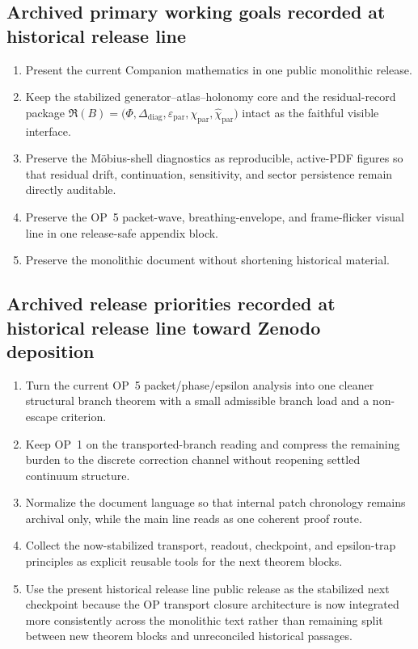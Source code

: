 \documentclass[12pt,a4paper]{article}
\DeclareRobustCommand{\QSCver}[1]{archival stage}
\renewcommand{\QSCver}[1]{historical release line}
\begin{document}
\subsection*{Archived primary working goals recorded at \QSCver{legacy.13.0}}
\begin{enumerate}[leftmargin=2em]
 \item Present the current Companion mathematics in one public monolithic release.
 \item Keep the stabilized generator--atlas--holonomy core and the residual-record package $\mathfrak R(B)=\bigl(\Phi,\Delta_{\mathrm{diag}},\varepsilon_{\mathrm{par}},\chi_{\mathrm{par}},\widehat\chi_{\mathrm{par}}\bigr)$ intact as the faithful visible interface.
 \item Preserve the M\"obius-shell diagnostics as reproducible, active-PDF figures so that residual drift, continuation, sensitivity, and sector persistence remain directly auditable.
 \item Preserve the OP~5 packet-wave, breathing-envelope, and frame-flicker visual line in one release-safe appendix block.
 \item Preserve the monolithic document without shortening historical material.
\end{enumerate}

\subsection*{Archived release priorities recorded at \QSCver{legacy.13.0} toward Zenodo deposition}
\begin{enumerate}[leftmargin=2em]
 \item Turn the current OP~5 packet/phase/epsilon analysis into one cleaner structural branch theorem with a small admissible branch load and a non-escape criterion.
 \item Keep OP~1 on the transported-branch reading and compress the remaining burden to the discrete correction channel without reopening settled continuum structure.
 \item Normalize the document language so that internal patch chronology remains archival only, while the main line reads as one coherent proof route.
 \item Collect the now-stabilized transport, readout, checkpoint, and epsilon-trap principles as explicit reusable tools for the next theorem blocks.
 \item Use the present \QSCver{legacy.13.0} public release as the stabilized next checkpoint because the OP transport closure architecture is now integrated more consistently across the monolithic text rather than remaining split between new theorem blocks and unreconciled historical passages.
\end{enumerate}
\end{document}
